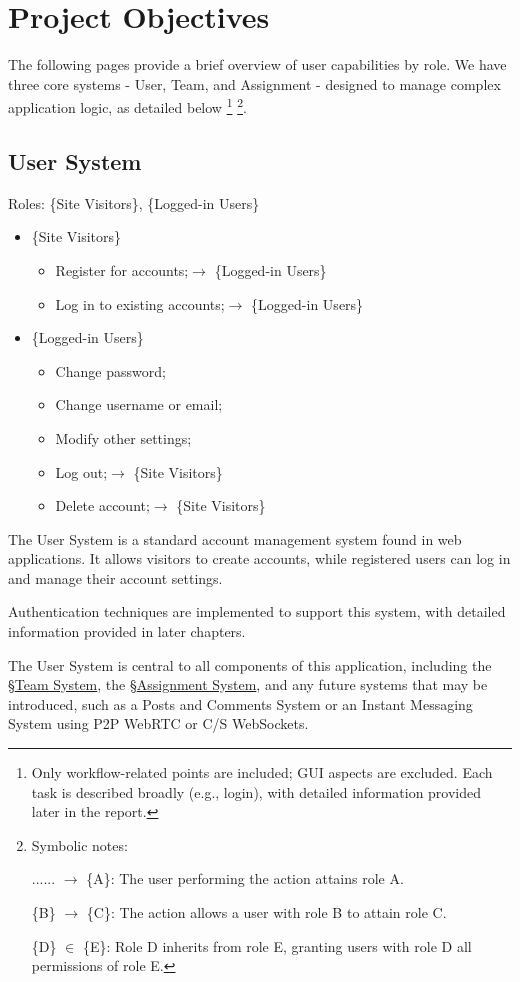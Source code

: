 \documentclass[12pt]{report}
\newcommand{\n}{\par}
\newcommand{\br}{\n\vspace{1 em}\n}
\begin{document}
\section{Project Objectives} \label{overview.project-objectives}
The following pages provide a brief overview of user capabilities by role.
We have three core systems - User, Team, and Assignment - designed to manage complex application logic, as detailed below
\footnote{Only workflow-related points are included; GUI aspects are excluded.
	Each task is described broadly (e.g., login), with detailed information provided later in the report.}
\footnote{Symbolic notes:\n
	...... $\rightarrow$ \{A\}: The user performing the action attains role A.\n
	\{B\} $\rightarrow$ \{C\}: The action allows a user with role B to attain role C.\n
	\{D\} $\in$ \{E\}: Role D inherits from role E, granting users with role D all permissions of role E.}.

\subsection{User System} \label{overview.project-objectives.user-system}
Roles: \{Site Visitors\}, \{Logged-in Users\}\n
\begin{itemize}
	\item \{Site Visitors\}
	      \begin{itemize}
		      \item Register for accounts;\null\hfill $\rightarrow$ \{Logged-in Users\}
		      \item Log in to existing accounts;\null\hfill $\rightarrow$ \{Logged-in Users\}
	      \end{itemize}
	\item \{Logged-in Users\}
	      \begin{itemize}
		      \item Change password;
		      \item Change username or email;
		      \item Modify other settings;
		      \item Log out;\null\hfill $\rightarrow$ \{Site Visitors\}
		      \item Delete account;\null\hfill $\rightarrow$ \{Site Visitors\}
	      \end{itemize}
\end{itemize}\n
The User System is a standard account management system found in web applications.
It allows visitors to create accounts, while registered users can log in and manage their account settings.
\br
Authentication techniques are implemented to support this system, with detailed information provided in later chapters.
\br
The User System is central to all components of this application,
including the \S \hyperref[overview.project-objectives.team-system]{Team System},
the \S \hyperref[overview.project-objectives.assignment-system]{Assignment System},
and any future systems that may be introduced,
such as a Posts and Comments System or an Instant Messaging System using P2P WebRTC or C/S WebSockets.
\end{document}
